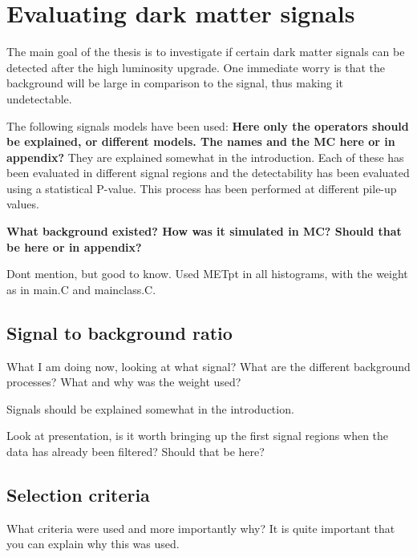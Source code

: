 \section{Evaluating dark matter signals}
The main goal of the thesis is to investigate if certain dark matter signals can be detected after the high luminosity upgrade. One immediate worry is that the background will be large in comparison to the signal, thus making it undetectable. 

The following signals models have been used:
\textbf{Here only the operators should be explained, or different models. The names and the MC here or in appendix?} They are explained somewhat in the introduction.
Each of these has been evaluated in different signal regions and the detectability has been evaluated using a statistical P-value. This process has been performed at different pile-up values. 

\textbf{What background existed? How was it simulated in MC? Should that be here or in appendix?}


Dont mention, but good to know. Used METpt in all histograms, with the weight as in main.C and mainclass.C. 


\subsection{Signal to background ratio}
What I am doing now, looking at what signal? What are the different background processes? What and why was the weight used?

Signals should be explained somewhat in the introduction.



Look at presentation, is it worth bringing up the first signal regions when the data has already been filtered? Should that be here?
 
\subsection{Selection criteria}
What criteria were used and more importantly why? It is quite important that you can explain why this was used.

